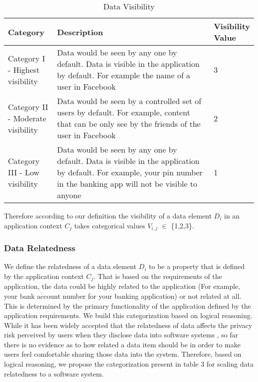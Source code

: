 \documentclass[10pt]{article}
\begin{document}
\begin{center}
\begin{table}[htbp]
\caption{Data Visibility}
\begin{center}
\begin{adjustbox}{width=0.5\textwidth} 
\begin{tabular}{|p{0.2\linewidth}|p{0.7\linewidth}|p{0.1\linewidth}|} 
\hline
Category & Description & Visibility Value \\
\hline
Category I - Highest visibility & Data would be seen by any one by default. Data is visible in the application by default. For example the name of a user in Facebook & 3 \\
\hline
Category II - Moderate visibility & Data would be seen by a controlled set of users by default. For example, content that can be only see by the friends of the user in Facebook & 2 \\
\hline
Category III - Low visibility & Data would be seen by any one by default. Data is visible in the application by default. For example, your pin number in the banking app will not be visible to anyone & 1 \\
\hline
\end{tabular}
\end{adjustbox}
\end{center}
\end{table}
\end{center} 

Therefore according to our definition the visibility of a data element \textit {$D_i$} in an application context \textit {$C_j$} takes categorical values \textit {$V_{i,j}$} $\in$ \{1,2,3\}.

\subsubsection{Data Relatedness} 

We define the relatedness of a data element \textit {$D_i$} to be a property that is defined by the application context \textit {$C_j$}. That is based on the requirements of the application, the data could be highly related to the application (For example, your bank account number for your banking application) or not related at all. This is determined by the primary functionality of the application defined by the application requirements. We build this categorization based on logical reasoning. While it has been widely accepted that the relatedness of data affects the privacy risk perceived by users when they disclose data into software systems  \cite {nissenbaum2009privacy, john2010strangers}, so far there is no evidence as to how related a data item should be in order to make users feel comfortable sharing those data into the system. Therefore, based on logical reasoning, we propose the categorization present in table 3 for scaling data relatedness to a software system. 
\end{document}
